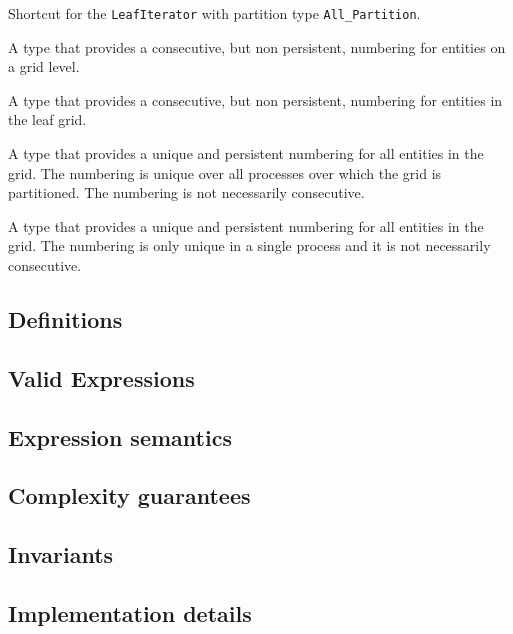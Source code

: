 \documentclass[11pt,a4paper,headinclude,footinclude,DIV14,BCOR8.25mm,titlepage,twoside,openright,normalheadings]{scrreprt}
\begin{document}
Shortcut for the \lstinline!LeafIterator! with partition type
\lstinline!All_Partition!. 


A type that provides a consecutive, but non persistent, numbering for
entities on a grid level. 

A type that provides a consecutive, but non persistent, numbering for
entities in the leaf grid. 

A type that provides a unique and persistent numbering for
all entities in the grid. The numbering is unique over all processes
over which the grid is partitioned. The numbering is not necessarily
consecutive.  

A type that provides a unique and persistent numbering for
all entities in the grid. The numbering is only unique in a single process
and it is not necessarily consecutive.  



\subsection{Definitions}

\subsection{Valid Expressions}

\subsection{Expression semantics}

\subsection{Complexity guarantees}

\subsection{Invariants}

\subsection{Implementation details}
\end{document}

